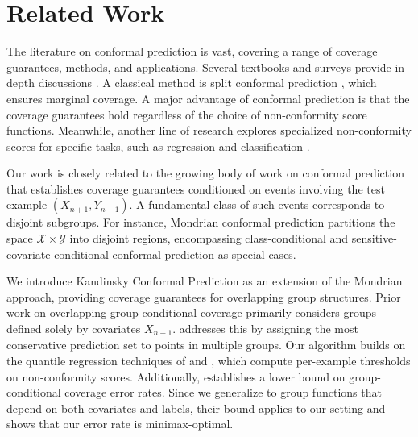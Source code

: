 \section{Related Work}


The literature on conformal prediction is vast, covering a range of coverage guarantees, methods, and applications. Several textbooks and surveys provide in-depth discussions \citep{AlgorithmicLearning2005, SV08, BHV14, ABB24}. A classical method is split conformal prediction \citep{PPVG02, LGRTW18}, which ensures marginal coverage. A major advantage of conformal prediction is that the coverage guarantees hold regardless of the choice of non-conformity score functions. Meanwhile, another line of research explores specialized non-conformity scores for specific tasks, such as regression \citep{LeiRW2013, RPC19, IzbickiSS20} and classification \citep{SLW19, ABMJ20, RSC20}.


Our work is closely related to the growing body of work on conformal prediction that establishes coverage guarantees conditioned on events involving the test example $(X_{n+1}, Y_{n+1})$. A fundamental class of such events corresponds to disjoint subgroups. For instance, Mondrian conformal prediction \citep{VLNG03} partitions the space  $\mathcal{X} \times \mathcal{Y}$ into disjoint regions, encompassing class-conditional \citep{LBLJ15, DABJT23} and sensitive-covariate-conditional \citep{RBSC20} conformal prediction as special cases. 

We introduce Kandinsky Conformal Prediction as an extension of the Mondrian approach, providing coverage guarantees for overlapping group structures. Prior work on overlapping group-conditional coverage primarily considers groups defined solely by covariates  $X_{n+1}$. \citet{BCRT21} addresses this by assigning the most conservative prediction set to points in multiple groups. Our algorithm builds on the quantile regression techniques of \citet{JNRR2023} and \citet{GCC2023}, which compute per-example thresholds on non-conformity scores. Additionally, \citet{ACDR24} establishes a lower bound on group-conditional coverage error rates. Since we generalize to group functions that depend on both covariates and labels, their bound applies to our setting and shows that our error rate is minimax-optimal.


